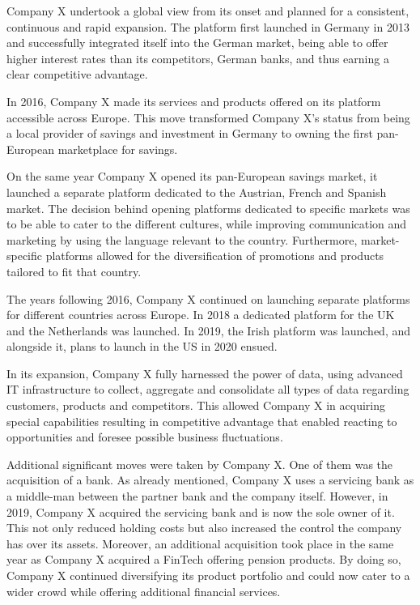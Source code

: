 \documentclass[11pt,a4paper]{article}
\begin{document}
{{Company X undertook a global view from its onset and planned for a consistent, continuous and rapid expansion. The platform first launched in Germany in 2013 and successfully integrated itself into the German market, being able to offer higher interest rates than its competitors, German banks, and thus earning a clear competitive advantage. \par
In 2016, Company X made its services and products offered on its platform accessible across Europe. This move transformed Company X's status from being a local provider of savings and investment in Germany to owning the first pan-European marketplace for savings. \par
On the same year Company X opened its pan-European savings market, it launched a separate platform dedicated to the Austrian, French and Spanish market. The decision behind opening platforms dedicated to specific markets was to be able to cater to the different cultures, while improving communication and marketing by using the language relevant to the country. Furthermore, market-specific platforms allowed for the diversification of promotions and products tailored to fit that country. \par 
The years following 2016, Company X continued on launching separate platforms for different countries across Europe. In 2018 a dedicated platform for the UK and the Netherlands was launched. In 2019, the Irish platform was launched, and alongside it, plans to launch in the US in 2020 ensued. \par
In its expansion, Company X fully harnessed the power of data, using advanced IT infrastructure to collect, aggregate and consolidate all types of data regarding customers, products and competitors. This allowed Company X in acquiring special capabilities resulting in competitive advantage \parencite{porterStrategyInternet2001} that enabled reacting to opportunities and foresee possible business fluctuations.  \par
Additional significant moves were taken by Company X. One of them was the acquisition of a bank. As already mentioned, Company X uses a servicing bank as a middle-man between the partner bank and the company itself. However, in 2019, Company X acquired the servicing bank and is now the sole owner of it. This not only reduced holding costs but also increased the control the company has over its assets. Moreover, an additional acquisition took place in the same year as Company X acquired a FinTech offering pension products. By doing so, Company X continued diversifying its product portfolio and could now cater to a wider crowd while offering additional financial services. \par

}}
\end{document}
